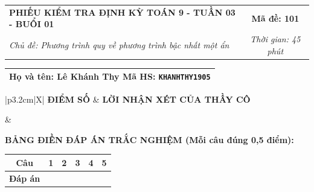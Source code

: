 \documentclass[12pt,a4paper]{article}
\begin{document}
\newpage



\noindent
\begin{tabularx}{\linewidth}{|X|c|}
\hline
\textbf{PHIẾU KIỂM TRA ĐỊNH KỲ TOÁN 9 - TUẦN 03 - BUỔI 01} & \textbf{Mã đề: 101} \\
\textit{Chủ đề: Phương trình quy về phương trình bậc nhất một ẩn} & \textit{Thời gian: 45 phút} \\
\hline
\end{tabularx}

\vspace{1mm}

\noindent
\begin{tabularx}{\linewidth}{|X|}
\hline
\rule[-2mm]{0pt}{7.5mm}\textbf{Họ và tên:} \textbf{\large Lê Khánh Thy} \hfill \textbf{Mã HS:} \texttt{KHANHTHY1905} \quad \\
\hline
\end{tabularx}

\vspace{1mm}

\noindent
\begin{tabularx}{\linewidth}{|p{3.2cm}|X|}
\hline
\centering\textbf{ĐIỂM SỐ} & \centering\textbf{LỜI NHẬN XÉT CỦA THẦY CÔ} \tabularnewline
\hline
\rule{0pt}{1.3cm} & \tabularnewline
\hline
\end{tabularx}

\vspace{1.2mm}

\noindent\textbf{BẢNG ĐIỀN ĐÁP ÁN TRẮC NGHIỆM (Mỗi câu đúng 0,5 điểm):}
\vspace{0.8mm}

\noindent
\renewcommand{\arraystretch}{1.35}
\begin{tabularx}{\linewidth}{|c|*{5}{>{\centering\arraybackslash}X|}}
\hline
\textbf{Câu} & \textbf{1} & \textbf{2} & \textbf{3} & \textbf{4} & \textbf{5} \\
\hline
\textbf{Đáp án} & & & & & \\
\hline
\end{tabularx}
\renewcommand{\arraystretch}{1.0}

\vspace{1.5mm}
\end{document}
